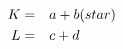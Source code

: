 \documentclass{article}
\begin{document}
\begin{eqnarray}
K &=& a + b & (star)\cr
L &=& c + d
\end{eqnarray}
\end{document}
